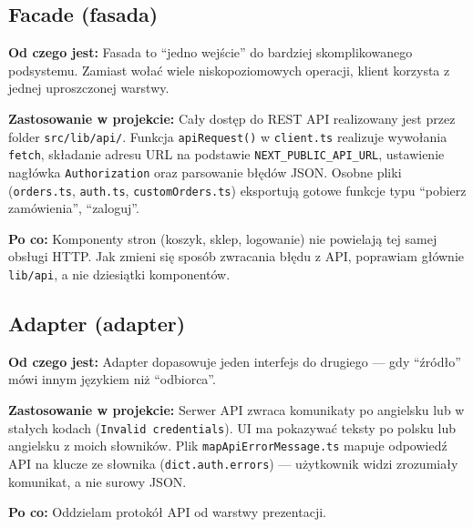 \documentclass[12pt,a4paper]{report}
\newenvironment{calosc}{%
  \Needspace{17\baselineskip}%
  \begin{samepage}%
}{%
  \end{samepage}%
}
\begin{document}
\begin{calosc}
\subsection{Facade (fasada)}

\textbf{Od czego jest:} Fasada to ``jedno wejście'' do bardziej skomplikowanego podsystemu. Zamiast wołać wiele niskopoziomowych operacji, klient korzysta z jednej uproszczonej warstwy.

\textbf{Zastosowanie w projekcie:} Cały dostęp do REST API realizowany jest przez folder \texttt{src/lib/api/}. Funkcja \texttt{apiRequest()} w \texttt{client.ts} realizuje wywołania \texttt{fetch}, składanie adresu URL na podstawie \texttt{NEXT\_PUBLIC\_API\_URL}, ustawienie nagłówka \texttt{Authorization} oraz parsowanie błędów JSON. Osobne pliki (\texttt{orders.ts}, \texttt{auth.ts}, \texttt{customOrders.ts}) eksportują gotowe funkcje typu ``pobierz zamówienia'', ``zaloguj''.

\textbf{Po co:} Komponenty stron (koszyk, sklep, logowanie) nie powielają tej samej obsługi HTTP. Jak zmieni się sposób zwracania błędu z API, poprawiam głównie \texttt{lib/api}, a nie dziesiątki komponentów.
\end{calosc}

\begin{calosc}
\subsection{Adapter (adapter)}

\textbf{Od czego jest:} Adapter dopasowuje jeden interfejs do drugiego --- gdy ``źródło'' mówi innym językiem niż ``odbiorca''.

\textbf{Zastosowanie w projekcie:} Serwer API zwraca komunikaty po angielsku lub w stałych kodach (\texttt{Invalid credentials}). UI ma pokazywać teksty po polsku lub angielsku z moich słowników. Plik \texttt{mapApiErrorMessage.ts} mapuje odpowiedź API na klucze ze słownika (\texttt{dict.auth.errors}) --- użytkownik widzi zrozumiały komunikat, a nie surowy JSON.

\textbf{Po co:} Oddzielam protokół API od warstwy prezentacji.
\end{calosc}
\end{document}
